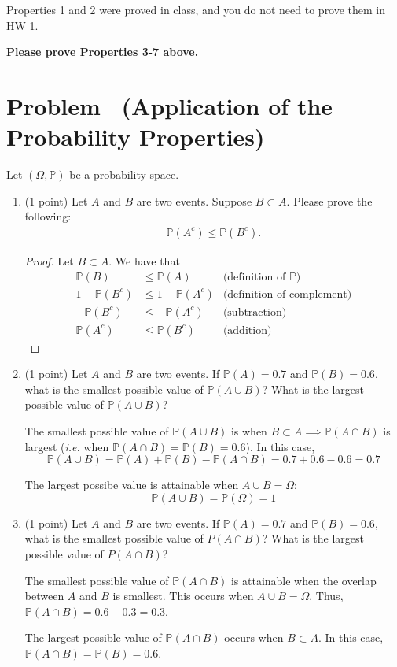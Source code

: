 \documentclass[11pt]{article}
\newcounter{pppp}
\newcommand{\prob}{\arabic{pppp}} %
\newcommand{\increase}{\addtocounter{pppp}{1}} %
\newcommand{\newproblem}[2]{
    \increase
    \section*{Problem \prob~(#1) \hfill {#2}}
}
\newcommand{\p}{\mathbb{P}}
\begin{document}
Properties 1 and 2 were proved in class, and you do not need to prove them in HW 1. 

\textbf{Please prove Properties 3-7 above.}

\newproblem{Application of the Probability Properties}{ }

Let $(\Omega, \mathbb{P})$ be a probability space.

\begin{enumerate}
\item (1 point) Let $A$ and $B$ are two events. Suppose $B\subset A$. Please prove the following:
\begin{align*}
\mathbb{P}(A^c) \le \mathbb{P}(B^c).
\end{align*}

\begin{proof}
  Let \(B\subset A\). We have that
  \begin{align*}
    \p(B)&\leq\p(A) & \text{(definition of \(\p\))}\\
    1-\p(B^c)&\leq 1-\p(A^c) & \text{(definition of complement)}\\
    -\p(B^c)&\leq -\p(A^c) & \text{(subtraction)}\\
    \p(A^c)&\leq\p(B^c) & \text{(addition)}
  \end{align*}
\end{proof}

\item (1 point) Let $A$ and $B$ are two events. If $\mathbb{P}(A) = 0.7$ and $\mathbb{P}(B)=0.6$,  what is the smallest possible value of $\mathbb{P}(A\cup B)$? What is the largest possible value of $\mathbb{P}(A\cup B)$? 

The smallest possible value of \(\p(A\cup B)\) is when \(B\subset A\implies \p(A\cap B)\) is largest (\emph{i.e.} when \(\p(A\cap B)=\p(B)=0.6\)). In this case,
\[\p(A\cup B)=\p(A)+\p(B)-\p(A\cap B)=0.7 + 0.6 - 0.6 = 0.7\]

The largest possibe value is attainable when \(A\cup B=\Omega\):
\[\p(A\cup B)=\p(\Omega)=1\]

\item (1 point) Let $A$ and $B$ are two events. If $\mathbb{P}(A) = 0.7$ and $\mathbb{P}(B)=0.6$, what is the smallest possible value of $P(A\cap B)$? What is the largest possible value of $P(A\cap B)$? 

The smallest possible value of \(\p(A\cap B)\) is attainable when the overlap between \(A\) and \(B\) is smallest.
This occurs when \(A\cup B=\Omega\). Thus, \(\p(A\cap B)=0.6-0.3=0.3\).

The largest possible value of \(\p(A\cap B)\) occurs when \(B\subset A\). In this case, \(\p(A\cap B)=\p(B)=0.6\).

\end{enumerate}
\end{document}
